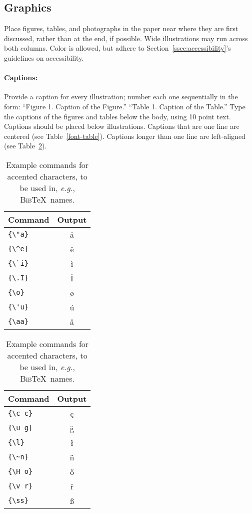 \documentclass[11pt,a4paper]{article}
\newcommand\BibTeX{B\textsc{ib}\TeX}
\begin{document}
\subsection{Graphics}

Place figures, tables, and photographs in the paper near where they are first discussed, rather than at the end, if possible.
Wide illustrations may run across both columns.
Color is allowed, but adhere to Section~\ref{ssec:accessibility}'s guidelines on accessibility.

\paragraph{Captions:}
Provide a caption for every illustration; number each one sequentially in the form:
``Figure 1. Caption of the Figure.''
``Table 1. Caption of the Table.''
Type the captions of the figures and tables below the body, using 10 point text.
Captions should be placed below illustrations.
Captions that are one line are centered (see Table~\ref{font-table}).
Captions longer than one line are left-aligned (see Table~\ref{tab:accents}).

\begin{table}
\centering
\begin{tabular}{lc}
\hline
\textbf{Command} & \textbf{Output}\\
\hline
\verb|{\"a}| & {\"a} \\
\verb|{\^e}| & {\^e} \\
\verb|{\`i}| & {\`i} \\ 
\verb|{\.I}| & {\.I} \\ 
\verb|{\o}| & {\o} \\
\verb|{\'u}| & {\'u}  \\ 
\verb|{\aa}| & {\aa}  \\\hline
\end{tabular}
\begin{tabular}{lc}
\hline
\textbf{Command} & \textbf{Output}\\
\hline
\verb|{\c c}| & {\c c} \\ 
\verb|{\u g}| & {\u g} \\ 
\verb|{\l}| & {\l} \\ 
\verb|{\~n}| & {\~n} \\ 
\verb|{\H o}| & {\H o} \\ 
\verb|{\v r}| & {\v r} \\ 
\verb|{\ss}| & {\ss} \\
\hline
\end{tabular}
\caption{Example commands for accented characters, to be used in, \emph{e.g.}, \BibTeX\ names.}\label{tab:accents}
\end{table}
\end{document}
